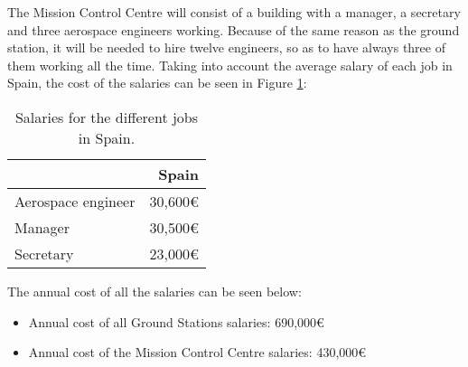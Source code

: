 The Mission Control Centre will consist of a building with a manager, a secretary and three aerospace engineers working. Because of the same reason as the ground station, it will be needed to hire twelve engineers, so as to have always three of them working all the time. Taking into account the average salary of each job in Spain, the cost of the salaries can be seen in Figure \ref{table:SalariesSpain}:
\begin{table}[H]
\begin{center}
\begin{tabular}{|l|r|}
\hline 
 & Spain \\ 
\hline 
Aerospace engineer & 30,600\euro \\ 
\hline 
Manager & 30,500\euro  \\ 
\hline 
Secretary & 23,000\euro  \\ 
\hline 
\end{tabular}
\end{center}
\caption[Salaries in Spain]{Salaries for the different jobs in Spain.}
\label{table:SalariesSpain}
\end{table}

The annual cost of all the salaries can be seen below:
\begin{itemize}
\item Annual cost of all Ground Stations salaries: 690,000\euro
\item Annual cost of the Mission Control Centre salaries: 430,000\euro
\end{itemize}